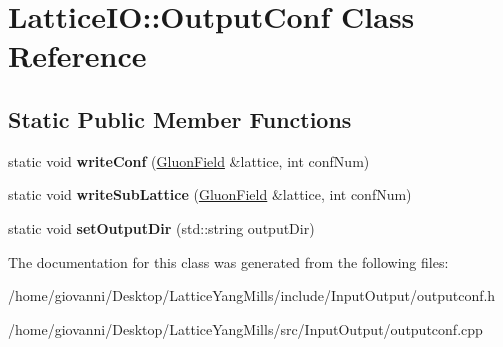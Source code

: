 \hypertarget{classLatticeIO_1_1OutputConf}{}\section{Lattice\+IO\+:\+:Output\+Conf Class Reference}
\label{classLatticeIO_1_1OutputConf}
\subsection*{Static Public Member Functions}
\begin{DoxyCompactItemize}
\item 
static void {\bfseries write\+Conf} (\hyperlink{classField}{Gluon\+Field} \&lattice, int conf\+Num)\hypertarget{classLatticeIO_1_1OutputConf_a11ca0a1237c846e35e7fe3aff8dbb4df}{}\label{classLatticeIO_1_1OutputConf_a11ca0a1237c846e35e7fe3aff8dbb4df}

\item 
static void {\bfseries write\+Sub\+Lattice} (\hyperlink{classField}{Gluon\+Field} \&lattice, int conf\+Num)\hypertarget{classLatticeIO_1_1OutputConf_a1c4247249c03a2ec761cf4eee25a47a1}{}\label{classLatticeIO_1_1OutputConf_a1c4247249c03a2ec761cf4eee25a47a1}

\item 
static void {\bfseries set\+Output\+Dir} (std\+::string output\+Dir)\hypertarget{classLatticeIO_1_1OutputConf_a6a14c8a578af927a26a48b01f6fb7907}{}\label{classLatticeIO_1_1OutputConf_a6a14c8a578af927a26a48b01f6fb7907}

\end{DoxyCompactItemize}


The documentation for this class was generated from the following files\+:\begin{DoxyCompactItemize}
\item 
/home/giovanni/\+Desktop/\+Lattice\+Yang\+Mills/include/\+Input\+Output/outputconf.\+h\item 
/home/giovanni/\+Desktop/\+Lattice\+Yang\+Mills/src/\+Input\+Output/outputconf.\+cpp\end{DoxyCompactItemize}

